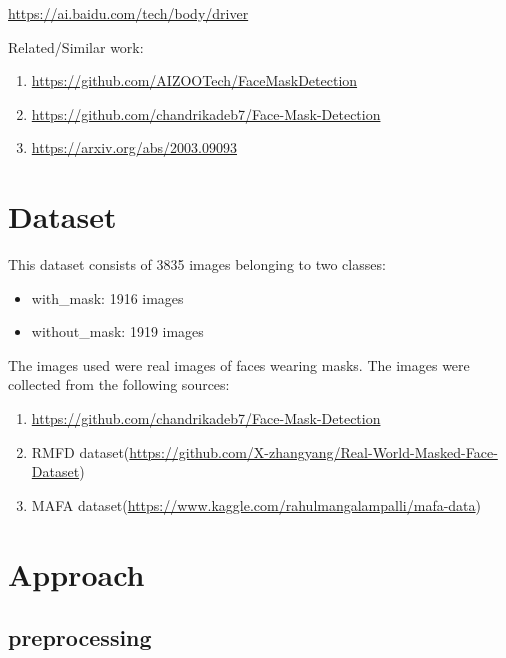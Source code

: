 \documentclass{article}
\begin{document}
\url{https://ai.baidu.com/tech/body/driver}


Related/Similar work:
\begin{enumerate}
  \item \url{https://github.com/AIZOOTech/FaceMaskDetection}
  \item \url{https://github.com/chandrikadeb7/Face-Mask-Detection}
  \item \url{https://arxiv.org/abs/2003.09093}
\end{enumerate}

\section{Dataset}
This dataset consists of 3835 images belonging to two classes:
\begin{itemize}
  \item with\_mask: 1916 images
  \item without\_mask: 1919 images
\end{itemize}
The images used were real images of faces wearing masks. The images were collected from the following sources:
\begin{enumerate}
  \item \url{https://github.com/chandrikadeb7/Face-Mask-Detection}
  \item RMFD dataset(\url{https://github.com/X-zhangyang/Real-World-Masked-Face-Dataset})
  \item MAFA dataset(\url{https://www.kaggle.com/rahulmangalampalli/mafa-data})
\end{enumerate}

\section{Approach}

\subsection{preprocessing}
\end{document}
